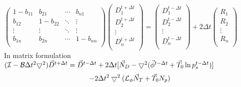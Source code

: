 ${\left(\begin{array}{*{4}{c}}
            1-b_{11} & b_{21}   & \cdots & b_{n1}   \\
            b_{12}   & 1-b_{22} & \ddots & \vdots   \\
            \vdots   & \vdots   & \ddots & \vdots   \\
            b_{1n}   & b_{2n}   & \cdots & 1-b_{nn} \\
            \end{array}
            \right)
\left(\begin{array}{*{1}{c}}
            D_{1}^{t+\Delta t}   \\
            D_{2}^{t+\Delta t}     \\
            \vdots   \\
            D_{n}^{t+\Delta t}    \\
            \end{array}
            \right)
=
\left(\begin{array}{*{1}{c}}
            D_{1}^{t-\Delta t}    \\
            D_{2}^{t-\Delta t}     \\
            \vdots   \\
            D_{n}^{t-\Delta t}      \\
            \end{array}
            \right)
+2 \Delta t
\left(\begin{array}{*{1}{c}}
            R_{1}    \\
            R_{2}     \\
            \vdots     \\
            R_{n}     \\
            \end{array}
            \right)}$\\


In matrix formulation\\

$({\cal I} - {\cal B} \Delta t^2 \bigtriangledown^2) \vec{D}^{t + \Delta t} =
\vec{D}^{t-\Delta t}
 + 2 \Delta t [ \vec{N}_D - \bigtriangledown^2 
(\vec{\phi}^{t - \Delta t} + \vec{T}_0 \ln p_s^{t- \Delta t})]$ \\
\begin{equation}
 - 2 \Delta t^2 \bigtriangledown^2 ({\cal L}_{\phi} \vec{N}_T + \vec{T}_0 N_p )
\end{equation}\\

